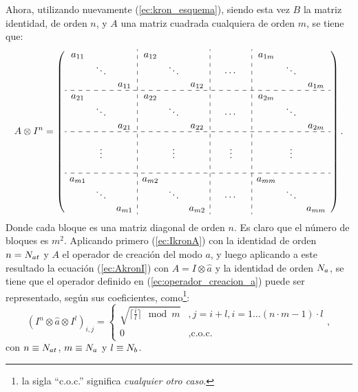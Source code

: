 \quad Ahora, utilizando nuevamente (\ref{ec:kron_esquema}), siendo esta vez $B$ la matriz identidad, de orden $n$, y $A$ una matriz cuadrada cualquiera de orden $m$, se tiene que:\begin{equation}\label{ec:AkronI}
 A \otimes I^n=
\left(\begin{array}{ccc:ccc:ccc:ccc}
a_{11}& & & a_{12} & & &  & & &a_{1m}& &  \\ 
&\ddots& & & \ddots & &  & \cdots & &&\ddots &  \\ 
& &a_{11} & & & a_{12} &  & & & & & a_{1m} \\ \hdashline

a_{21}& & & a_{22} & & &  & & &a_{2m}& &  \\ 
&\ddots& & & \ddots & &  & \cdots & &&\ddots &  \\ 
& &a_{21} & & & a_{22} &  & & & & & a_{2m} \\ \hdashline

& & & & & & & & & & &  \\ 
&\vdots& & & \vdots & &  & \vdots & &&\vdots &  \\ 
& & & & & & & & & & & \\ \hdashline

a_{m1}& & & a_{m2} & & &  & & &a_{mm}& &  \\ 
&\ddots& & & \ddots & &  & \cdots & &&\ddots &  \\ 
& &a_{m1} & & & a_{m2} &  & & & & & a_{mm}
\end{array}\right).
\end{equation}
\quad Donde cada bloque es una matriz diagonal de orden $n$. Es claro que el n\'umero de bloques es $m^2$. Aplicando primero (\ref{ec:IkronA}) con la identidad de orden $n=N_{at}$ y $A$ el operador de creaci\'on del modo $a$, y luego aplicando a este resultado la ecuaci\'on (\ref{ec:AkronI}) con $A=I\otimes \hat{a}$ y la identidad de orden $N_a$, se tiene que el operador definido en (\ref{ec:operador_creacion_a}) puede ser representado, seg\'un sus coeficientes, como\footnote{la sigla ``c.o.c.'' significa \emph{cualquier otro caso}.}:\begin{equation}\label{ec:coef_operador_creacion_generalizado}
(I^n\otimes \hat{a} \otimes I^l)_{i,j}=\left\{
\begin{array}{cl}
 \sqrt{\lceil \frac{i}{l} \rceil \mod m} & ,j=i+l,i=1 \ldots (n\cdot m -1)\cdot l\\
0 & ,\mbox{c.o.c.}
\end{array}
\right.,
\end{equation}
con $n\equiv N_{at}$, $m\equiv N_a$ y $l\equiv N_b$.
